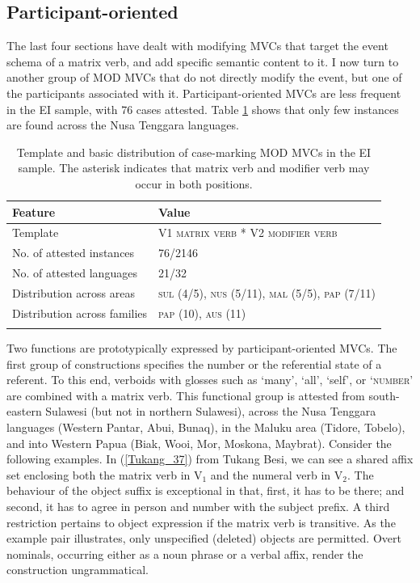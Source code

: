 \subsection{Participant-oriented}

The last four sections have dealt with modifying MVCs that target the event schema of a matrix verb, and add specific semantic content to it. I now turn to another group of MOD MVCs that do not directly modify the event, but one of the participants associated with it. Participant-oriented MVCs are less frequent in the EI sample, with 76 cases attested. Table \ref{table:participant} shows that only few instances are found across the Nusa Tenggara languages.

\begin{table}
\begin{tabular}{ll}
\lsptoprule
Feature&Value\tabularnewline
\midrule
Template&V1 \textsc{matrix verb} * V2 \textsc{modifier verb}\tabularnewline
No. of attested instances& 76/2146 \tabularnewline
No. of attested languages& 21/32 \tabularnewline
Distribution across areas& \textsc{sul} (4/5), \textsc{nus} (5/11), \textsc{mal} (5/5), \textsc{pap} (7/11) \tabularnewline
Distribution across families& \textsc{pap} (10), \textsc{aus} (11) \tabularnewline
\lspbottomrule
\end{tabular}
\caption[Template and basic distribution of case-marking MOD MVCs]{Template and basic distribution of case-marking MOD MVCs in the EI sample. The asterisk indicates that matrix verb and modifier verb may occur in both positions.}
\label{table:participant}
\end{table}

Two functions are prototypically expressed by participant-oriented MVCs. The first group of constructions specifies the number or the referential state of a referent. To this end, verboids with glosses such as `many', `all', `self', or `\textsc{number}' are combined with a matrix verb. This functional group is attested from south-eastern Sulawesi (but not in northern Sulawesi), across the Nusa Tenggara languages (Western Pantar, Abui, Bunaq), in the Maluku area (Tidore, Tobelo), and into Western Papua (Biak, Wooi, Mor, Moskona, Maybrat). Consider the following examples. In (\ref{Tukang_37}) from Tukang Besi, we can see a shared affix set enclosing both the matrix verb in V$_1$ and the numeral verb in V$_2$. The behaviour of the object suffix is exceptional in that, first, it has to be there; and second, it has to agree in person and number with the subject prefix. A third restriction pertains to object expression if the matrix verb is transitive. As the example pair illustrates, only unspecified (deleted) objects are permitted. Overt nominals, occurring either as a noun phrase or a verbal affix, render the construction ungrammatical.

